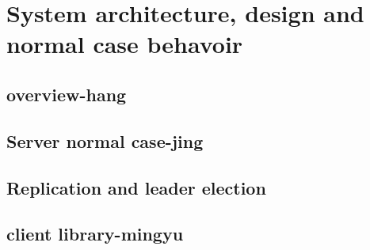 \section{System architecture, design and normal case behavoir}
\subsection{overview-hang}

\subsection{Server normal case-jing}


\subsection{Replication and leader election}


\subsection{client library-mingyu}

